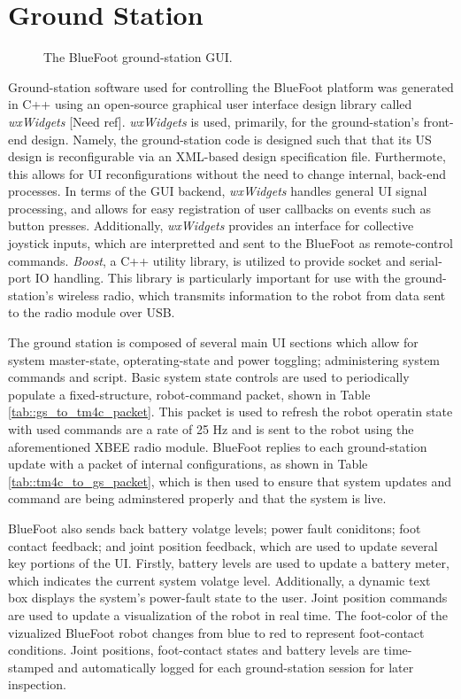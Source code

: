 	\section{Ground Station}
		
		\begin{figure}[h!]
			\centering
			\caption{The BlueFoot ground-station GUI.}
			\label{fig::comm_flow}
		\end{figure}

	Ground-station software used for controlling the BlueFoot platform was generated in C++ using an open-source graphical user interface design library called \emph{wxWidgets} [Need ref]. \emph{wxWidgets} is used, primarily, for the ground-station's front-end design. Namely, the ground-station code is designed such that that its US design is reconfigurable via an XML-based design specification file. Furthermote, this allows for UI reconfigurations without the need to change internal, back-end processes. In terms of the GUI backend, \emph{wxWidgets} handles general UI signal processing, and allows for easy registration of user callbacks on events such as button presses. Additionally, \emph{wxWidgets} provides an interface for collective joystick inputs, which are interpretted and sent to the BlueFoot as remote-control commands. \emph{Boost}, a C++ utility library, is utilized to provide socket and serial-port IO handling. This library is particularly important for use with the ground-station's wireless radio, which transmits information to the robot from data sent to the radio module over USB.  

	 The ground station is composed of several main UI sections which allow for system master-state, opterating-state and power toggling; administering system commands and script. Basic system state controls are used to periodically populate a fixed-structure, robot-command packet, shown in Table \ref{tab::gs_to_tm4c_packet}. This packet is used to refresh the robot operatin state with used commands are a rate of 25 Hz and is sent to the robot using the aforementioned XBEE radio module. BlueFoot replies to each ground-station update with a packet of internal configurations, as shown in Table \ref{tab::tm4c_to_gs_packet}, which is then used to ensure that system updates and command are being adminstered properly and that the system is live.

	BlueFoot also sends back battery volatge levels; power fault coniditons; foot contact feedback; and joint position feedback, which are used to update several key portions of the UI. Firstly, battery levels are used to update a battery meter, which indicates the current system volatge level. Additionally, a dynamic text box displays the system's power-fault state to the user. Joint position commands are used to update a visualization of the robot in real time. The foot-color of the vizualized BlueFoot robot changes from blue to red to represent foot-contact conditions. Joint positions, foot-contact states and battery levels are time-stamped and automatically logged for each ground-station session for later inspection. 

